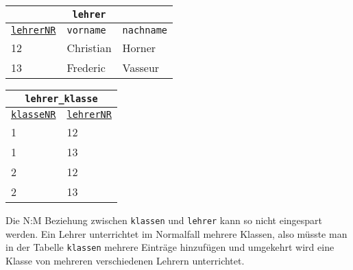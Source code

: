 \begin{minipage}{\textwidth}
	\begin{minipage}{0.5\textwidth}
		\begin{tabular}{lll}
			\multicolumn{3}{c}{\lstinline!lehrer!}\\
			\hline
			\underline{\lstinline!lehrerNR!}&\lstinline!vorname!&\lstinline!nachname!\\
			\hline
			12&Christian&Horner\\
			13&Frederic&Vasseur\\
		\end{tabular}
	\end{minipage}%
	\begin{minipage}{0.5\textwidth}
		\begin{tabular}{ll}
			\multicolumn{2}{c}{\lstinline!lehrer_klasse!}\\
			\hline
			\underline{\lstinline!klasseNR!}&\underline{\lstinline!lehrerNR!}\\
			\hline
			1&12\\
			1&13\\
			2&12\\
			2&13\\
		\end{tabular}
	\end{minipage}%
\end{minipage}
Die N:M Beziehung zwischen \lstinline!klassen! und \lstinline!lehrer! kann so nicht eingespart werden. Ein Lehrer unterrichtet im Normalfall mehrere Klassen, also müsste man in der Tabelle \lstinline!klassen! mehrere Einträge hinzufügen und umgekehrt wird eine Klasse von mehreren verschiedenen Lehrern unterrichtet.
\begin{Exercise}[title={Überlege dir welche Beziehungstabellen man in Aufgabe \ref{ERMErstellen1} durch Optimierung einsparen kann und gib an, welches Attribut man an welchen Entitätstyp als Fremdschlüssel hinzufügen muss.}, label=Optimierung]
\end{Exercise}
